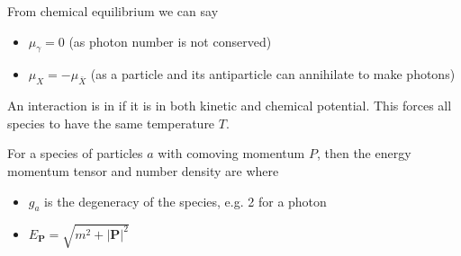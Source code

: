 \documentclass{article}
\begin{document}
\begin{lemma}
From chemical equilibrium we can say 
\begin{itemize}
    \item $\mu_\gamma = 0$ (as photon number is not conserved)
    \item $\mu_X = -\mu_{\bar{X}}$ (as a particle and its antiparticle can annihilate to make photons)
\end{itemize}
\end{lemma}

\begin{definition}
An interaction is in  if it is in both kinetic and chemical potential. This forces all species to have the same temperature $T$. 
\end{definition}

\begin{definition}
For a species of particles $a$ with comoving momentum $P$, then the energy momentum tensor and number density are 
where 
\begin{itemize}
    \item $g_a$ is the degeneracy of the species, e.g. 2 for a photon
    \item $E_{\bm{P}} = \sqrt{m^2 + |\bm{P}|^2}$
\end{itemize}
\end{definition}
\end{document}
